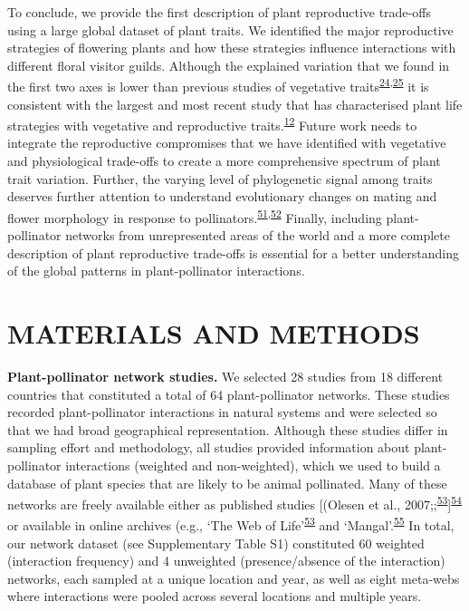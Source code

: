 \documentclass[
  12pt,
  a4paper,
]{article}
\begin{document}
To conclude, we provide the first description of plant reproductive trade-offs using a large global dataset of plant traits. We identified the major reproductive strategies of flowering plants and how these strategies influence interactions with different floral visitor guilds. Although the explained variation that we found in the first two axes is lower than previous studies of vegetative traits\textsuperscript{\protect\hyperlink{ref-diaz2016}{24},\protect\hyperlink{ref-carmona2021}{25}} it is consistent with the largest and most recent study that has characterised plant life strategies with vegetative and reproductive traits.\textsuperscript{\protect\hyperlink{ref-salguero2016}{12}} Future work needs to integrate the reproductive compromises that we have identified with vegetative and physiological trade-offs to create a more comprehensive spectrum of plant trait variation. Further, the varying level of phylogenetic signal among traits deserves further attention to understand evolutionary changes on mating and flower morphology in response to pollinators.\textsuperscript{\protect\hyperlink{ref-gervasi2017}{51},\protect\hyperlink{ref-mackin2021}{52}} Finally, including plant-pollinator networks from unrepresented areas of the world and a more complete description of plant reproductive trade-offs is essential for a better understanding of the global patterns in plant-pollinator interactions.

\hypertarget{materials-and-methods}{%
\section{MATERIALS AND METHODS}\label{materials-and-methods}}

\textbf{Plant-pollinator network studies.} We selected 28 studies from 18 different countries that constituted a total of 64 plant-pollinator networks. These studies recorded plant-pollinator interactions in natural systems and were selected so that we had broad geographical representation. Although these studies differ in sampling effort and methodology, all studies provided information about plant-pollinator interactions (weighted and non-weighted), which we used to build a database of plant species that are likely to be animal pollinated. Many of these networks are freely available either as published studies {[}(Olesen et al., 2007;;\textsuperscript{\protect\hyperlink{ref-fortuna2010}{53}}{]}\textsuperscript{\protect\hyperlink{ref-carvalheiro2014}{54}} or available in online archives (e.g., `The Web of Life'\textsuperscript{\protect\hyperlink{ref-fortuna2010}{53}} and `Mangal'.\textsuperscript{\protect\hyperlink{ref-poisot2016}{55}} In total, our network dataset (see Supplementary Table S1) constituted 60 weighted (interaction frequency) and 4 unweighted (presence/absence of the interaction) networks, each sampled at a unique location and year, as well as eight meta-webs where interactions were pooled across several locations and multiple years.
\end{document}
